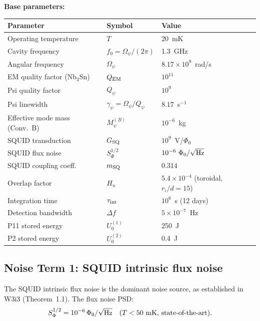 \documentclass[11pt,twocolumn]{article}
\newcommand{\Opsi}{\Omega_\psi}
\newcommand{\gpsi}{\gamma_\psi}
\newcommand{\Mpsi}{M_\psi}
\newcommand{\ee}[1]{\times 10^{#1}}
\newcommand{\Qpsi}{Q_\psi}
\newcommand{\Heff}{H_n}
\theoremstyle{definition}
\theoremstyle{remark}
\begin{document}
\medskip
\noindent
\textbf{Base parameters:}
\begin{center}
\begin{tabular}{lll}
\toprule
Parameter & Symbol & Value \\
\midrule
Operating temperature & $T$ & 20~mK \\
Cavity frequency & $f_0 = \Opsi/(2\pi)$ & 1.3~GHz \\
Angular frequency & $\Opsi$ & $8.17\ee{9}$~rad/s \\
EM quality factor (Nb$_3$Sn) & $Q_{\rm EM}$ & $10^{11}$ \\
Psi quality factor & $\Qpsi$ & $10^9$ \\
Psi linewidth & $\gpsi = \Opsi/\Qpsi$ & $8.17$~s$^{-1}$ \\
Effective mode mass (Conv.~B) & $\Mpsi^{(B)}$ & $10^{-6}$~kg \\
SQUID transduction & $G_{\rm SQ}$ & $10^9$~V/$\Phi_0$ \\
SQUID flux noise & $S_\Phi^{1/2}$ & $10^{-6}~\Phi_0/\sqrt{\rm Hz}$ \\
SQUID coupling coeff.\ & $m_{\rm SQ}$ & $0.314$ \\
Overlap factor & $\Heff$ & $5.4\ee{-4}$ (toroidal, $r_i/d=15$) \\
Integration time & $\tau_{\rm int}$ & $10^6$~s (12 days) \\
Detection bandwidth & $\Delta f$ & $5\ee{-7}$~Hz \\
P11 stored energy & $U_0^{(1)}$ & 250~J \\
P2 stored energy & $U_0^{(2)}$ & 0.4~J \\
\bottomrule
\end{tabular}
\end{center}

\subsection{Noise Term 1: SQUID intrinsic flux noise}
\label{sec:noise_squid}

The SQUID intrinsic flux noise is the dominant noise source, as
established in W3i3 (Theorem~1.1). The flux noise PSD:
\begin{equation}
S_\Phi^{1/2} = 10^{-6}\,\Phi_0/\sqrt{\rm Hz}
\quad (T < 50~\text{mK, state-of-the-art}).
\label{eq:squid_noise}
\end{equation}
\end{document}
